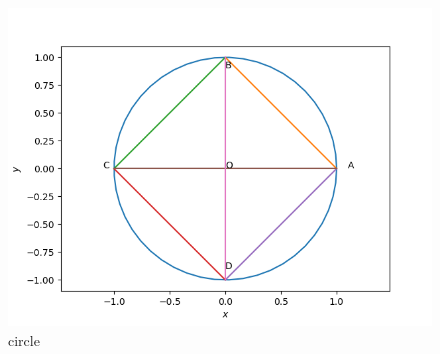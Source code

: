 \documentclass[journal,12pt,twocolumn]{IEEEtran}
\begin{document}
\begin{figure}[!htb]
    \centering
    \includegraphics[width=\columnwidth]{figs/circle.png}
    \caption{circle}
    \label{fig:circle}
\end{figure}
\end{document}
